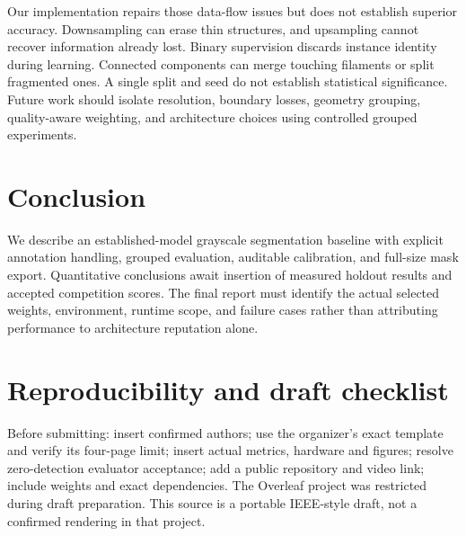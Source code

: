 \documentclass[conference]{IEEEtran}
\begin{document}
Our implementation repairs those data-flow issues but does not establish
superior accuracy. Downsampling can erase thin structures, and upsampling
cannot recover information already lost. Binary supervision discards instance
identity during learning. Connected components can merge touching filaments
or split fragmented ones. A single split and seed do not establish statistical
significance. Future work should isolate resolution, boundary losses,
geometry grouping, quality-aware weighting, and architecture choices using
controlled grouped experiments.

\section{Conclusion}
We describe an established-model grayscale segmentation baseline with explicit
annotation handling, grouped evaluation, auditable calibration, and full-size
mask export. Quantitative conclusions await insertion of measured holdout
results and accepted competition scores. The final report must identify the
actual selected weights, environment, runtime scope, and failure cases rather
than attributing performance to architecture reputation alone.

\section*{Reproducibility and draft checklist}
Before submitting: insert confirmed authors; use the organizer's exact
template and verify its four-page limit; insert actual metrics, hardware and
figures; resolve zero-detection evaluator acceptance; add a public repository
and video link; include weights and exact dependencies. The Overleaf project
was restricted during draft preparation. This source is a portable IEEE-style
draft, not a confirmed rendering in that project.



\end{document}
